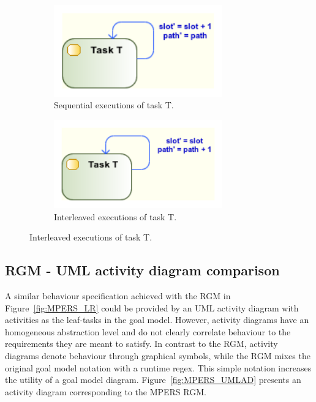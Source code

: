 \begin{figure}[ht!]
        \centering
        \begin{subfigure}[b]{0.4\textwidth}
                \includegraphics[width=0.80\textwidth]{imgs/UML_MUL_SEQ_TSKS.png}
				\caption{Sequential executions of task T.}
				\label{fig:UML_MUL_SEQ_TSKS}
        \end{subfigure}        
        \quad %
        \begin{subfigure}[b]{0.4\textwidth}                
                \includegraphics[width=0.80\textwidth]{imgs/UML_MUL_PAR_TSKS.png}
				\caption{Interleaved executions of task T.}
				\label{fig:UML_MUL_PAR_TSKS}
        \end{subfigure}%
          
\end{figure}


\subsection{RGM - UML activity diagram comparison}\label{ssec:RGM-UML}

A similar behaviour specification achieved with the RGM in Figure~\ref{fig:MPERS_LR} could be provided by an UML activity diagram with activities as the leaf-tasks in the goal model. However, activity diagrams have an homogeneous abstraction level and do not clearly correlate behaviour to the requirements they are meant to satisfy. In contrast to the RGM, activity diagrams denote behaviour through graphical symbols, while the RGM mixes the original goal model notation with a runtime regex. This simple notation increases the utility of a goal model diagram. Figure~\ref{fig:MPERS_UMLAD} presents an activity diagram corresponding to the MPERS RGM. 

